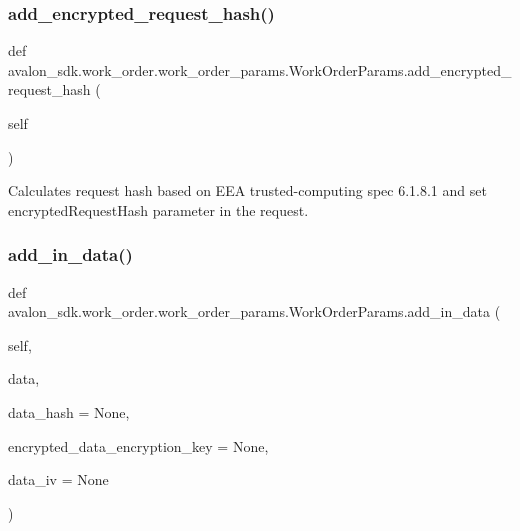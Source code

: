 \subsubsection{\texorpdfstring{add\+\_\+encrypted\+\_\+request\+\_\+hash()}{add\_encrypted\_request\_hash()}}
{\footnotesize\ttfamily def avalon\+\_\+sdk.\+work\+\_\+order.\+work\+\_\+order\+\_\+params.\+Work\+Order\+Params.\+add\+\_\+encrypted\+\_\+request\+\_\+hash (\begin{DoxyParamCaption}\item[{}]{self }\end{DoxyParamCaption})}

\begin{DoxyVerb}Calculates request hash based on EEA trusted-computing spec 6.1.8.1
and set encryptedRequestHash parameter in the request.
\end{DoxyVerb}
 \mbox{\label{classavalon__sdk_1_1work__order_1_1work__order__params_1_1WorkOrderParams_ad4246dcd636f2415be2ca90293e4bb0f}} 
\subsubsection{\texorpdfstring{add\+\_\+in\+\_\+data()}{add\_in\_data()}}
{\footnotesize\ttfamily def avalon\+\_\+sdk.\+work\+\_\+order.\+work\+\_\+order\+\_\+params.\+Work\+Order\+Params.\+add\+\_\+in\+\_\+data (\begin{DoxyParamCaption}\item[{}]{self,  }\item[{}]{data,  }\item[{}]{data\+\_\+hash = {\ttfamily None},  }\item[{}]{encrypted\+\_\+data\+\_\+encryption\+\_\+key = {\ttfamily None},  }\item[{}]{data\+\_\+iv = {\ttfamily None} }\end{DoxyParamCaption})}

